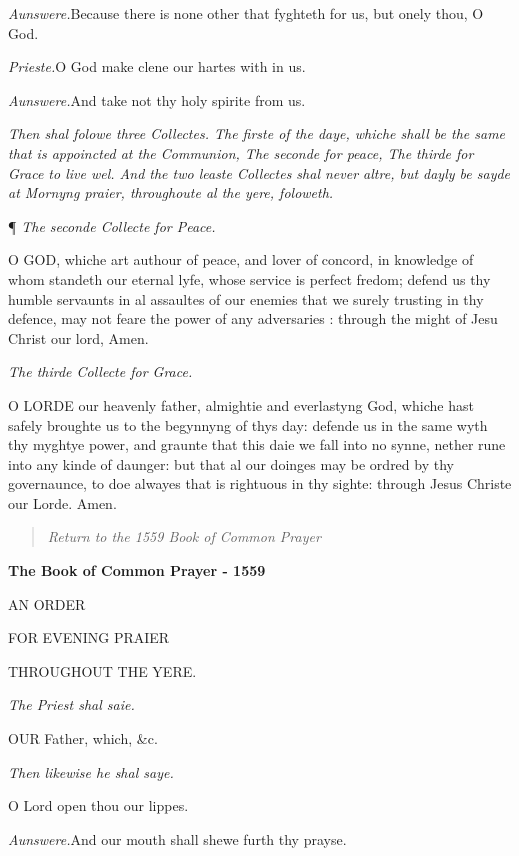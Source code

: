 \emph{Aunswere.}Because there
is none other that fyghteth for us, but onely thou, O God.

\emph{Prieste.}O God make clene
our hartes with in us.

\emph{Aunswere.}And take not
thy holy spirite from us.

\emph{Then
shal folowe three Collectes. The firste of the daye, whiche shall be the
same that is appoincted at the Communion, The seconde for peace, The thirde
for Grace to live wel. And the two leaste Collectes shal never altre,
but dayly be sayde at Mornyng praier, throughoute al the yere, foloweth.}

¶
\emph{The seconde Collecte for Peace.}

O
GOD, whiche art authour of peace, and lover of concord, in knowledge of
whom standeth our eternal lyfe, whose service is perfect fredom; defend
us thy humble servaunts in al assaultes of our enemies that we surely
trusting in thy defence, may not feare the power of any adversaries :
through the might of Jesu Christ our lord, Amen.

\emph{The
thirde Collecte for Grace.}

O
LORDE our heavenly father, almightie and everlastyng God, whiche hast
safely broughte us to the begynnyng of thys day: defende us in the same
wyth thy myghtye power, and graunte that this daie we fall into no synne,
nether rune into any kinde of daunger: but that al our doinges may be
ordred by thy governaunce, to doe alwayes that is rightuous in thy sighte:
through Jesus Christe our Lorde. Amen.

\begin{quote}

\emph{Return to the 1559
Book of Common Prayer}

\end{quote}


\textbf{The Book of Common Prayer - 1559}

\textbf{}AN
ORDER

FOR EVENING PRAIER

THROUGHOUT THE
YERE.

\emph{The
Priest shal saie.}

OUR
Father, which, \&c.

\emph{Then
likewise he shal saye.}

O Lord open thou our lippes.

\emph{Aunswere.}And our mouth
shall shewe furth thy prayse.

